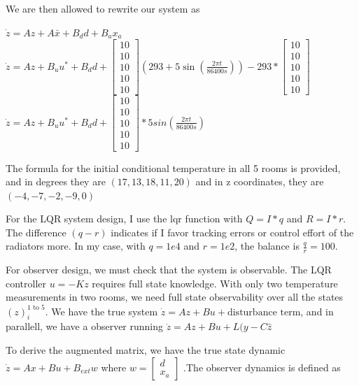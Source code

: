 \documentclass[12pt,A4, onecolumn]{exam}
\begin{document}
\begin{questions}
\begin{solution}
\begin{parts}
    We are then allowed to rewrite our system as 

    $ \dot{z} = Az + A\bar{x} + B_d d + B_a x_a  $\\
    $ \dot{z} = Az+ B_u u^*  + B_d d + \begin{bmatrix}
        10\\
        10\\
        10\\
        10\\
        10
    \end{bmatrix} \left( 293 + 5 \sin \left( \frac{ 2\pi t }{ 86400s } \right)  \right) - 293 * \begin{bmatrix}
        10\\
        10\\
        10\\
        10\\
        10
    \end{bmatrix}  $  \\
    $ \dot{z} = Az+ B_u u^*  +B_d d + \begin{bmatrix}
        10\\
        10\\
        10\\
        10\\
        10
    \end{bmatrix} * 5sin \left( \frac{ 2\pi t }{ 86400s } \right) $ 

    The formula for the initial conditional temperature in all 5 rooms is provided, and in degrees they are $ \left( 17, 13, 18, 11, 20 \right)  $ and in z coordinates, they are $ \left( -4, -7, -2, -9, 0 \right)$
    
    
    For the LQR system design, I use the lqr function with 
    $ Q = I*q $ and $ R = I*r $. The difference $ \left( q-r \right) $ indicates if I favor tracking errors or control effort of the radiators more. In my case, with $ q=1e4 $ and $ r=1e2 $, the balance is $ \frac{ q }{ r }=100 $. 
    
    For observer design, we must check that the system is observable. The LQR controller $ u=-K z $ requires full state knowledge.  With only two temperature measurements in two rooms, we need full state observability over all the states $ \left( z \right) _i^{1 \text{ to } 5} $. We have the true system $ \dot{z} = Az + Bu +\text{disturbance term} $, and in parallell, we have a observer running $ \dot{z} = Az + Bu + L(y - C\hat{z} $   

    To derive the augmented matrix, we have the true state dynamic $ \dot{z} = Ax + Bu + B_{ext} w $ where $ w = \begin{bmatrix}
        d\\
        x_a
    \end{bmatrix}  $  
    .The observer dynamics is defined as 
    

\end{parts}
\end{solution}
\end{questions}
\end{document}
